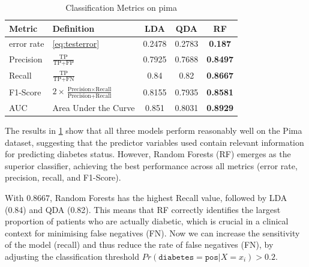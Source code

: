 \documentclass[12pt,a4paper,titlepage]{article}
\numberwithin{equation}{section}
\numberwithin{table}{section}
\numberwithin{figure}{section}
\begin{document}
\begin{table}[h]
\centering
\caption{Classification Metrics on pima}
\label{tab:metrics_pima}
    \begin{tabular}{llccc}
    \toprule
    \textbf{Metric} & \textbf{Definition} & \textbf{LDA} & \textbf{QDA} & \textbf{RF} \\
    \midrule
    error rate             & \ref{eq:testerror}          & 0.2478       & 0.2783       & \textbf{0.187} \\
    Precision       & $\frac{\text{TP}}{\text{TP} + \text{FP}}$        & 0.7925       & 0.7688       & \textbf{0.8497} \\
    Recall          & $\frac{\text{TP}}{\text{TP} + \text{FN}}$        & 0.84         & 0.82         & \textbf{0.8667} \\
    F1-Score        & $2 \times \frac{\text{Precision} \times \text{Recall}}{\text{Precision} + \text{Recall}}$ & 0.8155       & 0.7935       & \textbf{0.8581} \\ 
    AUC             & Area Under the Curve          & 0.851       & 0.8031 & \textbf{0.8929} \\ 
    \bottomrule
    \end{tabular}
\end{table}
     
\noindent The results in \ref{tab:metrics_pima} show that all three models perform reasonably well on the Pima dataset, suggesting that the predictor variables used contain relevant information for predicting diabetes status. However, Random Forests (RF) emerges as the superior classifier, achieving the best performance across all metrics (error rate, precision, recall, and F1-Score).

\noindent With $0.8667$, Random Forests has the highest Recall value, followed by LDA (0.84) and QDA (0.82). This means that RF correctly identifies the largest proportion of patients who are actually diabetic, which is crucial in a clinical context for minimising false negatives (FN). Now we can increase the sensitivity of the model (recall) and thus reduce the rate of false negatives (FN), by adjusting the classification threshold $Pr(\texttt{diabetes}=\texttt{pos}|X=x_i)>0.2$. 
\end{document}
